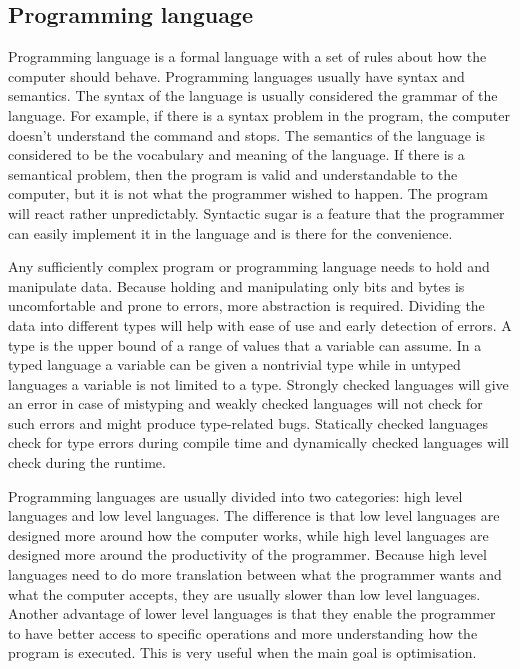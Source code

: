
\subsection{Programming language}

Programming language is a formal language with a set of rules about how the
computer should behave. Programming languages usually have syntax and semantics.
The syntax of the language is usually considered the grammar of the language.
For example, if there is a syntax problem in the program, the computer doesn't
understand the command and stops. The semantics of the language is considered to
be the vocabulary and meaning of the language. If there is a semantical problem,
then the program is valid and understandable to the computer, but it is not what
the programmer wished to happen. The program will react rather unpredictably.
Syntactic sugar is a feature that the programmer can easily implement it in the
language and is there for the convenience.\cite{website:syntax-semantics}

Any sufficiently complex program or programming language needs to hold and
manipulate data. Because holding and manipulating only bits and bytes is
uncomfortable and prone to errors, more abstraction is required. Dividing the
data into different types will help with ease of use and early detection of
errors. A type is the upper bound of a range of values that a variable can
assume. In a typed language a variable can be given a nontrivial type while in
untyped languages a variable is not limited to a type. Strongly checked
languages will give an error in case of mistyping and weakly checked languages
will not check for such errors and might produce type-related bugs. Statically
checked languages check for type errors during compile time and dynamically
checked languages will check during the runtime.\cite{cardelli96}

Programming languages are usually divided into two categories: high level
languages and low level languages. The difference is that low level languages
are designed more around how the computer works, while high level languages are
designed more around the productivity of the programmer. Because high level
languages need to do more translation between what the programmer wants and what
the computer accepts, they are usually slower than low level languages. Another
advantage of lower level languages is that they enable the programmer to have
better access to specific operations and more understanding how the program is
executed. This is very useful when the main goal is
optimisation.\cite{website:scripting-languages}

